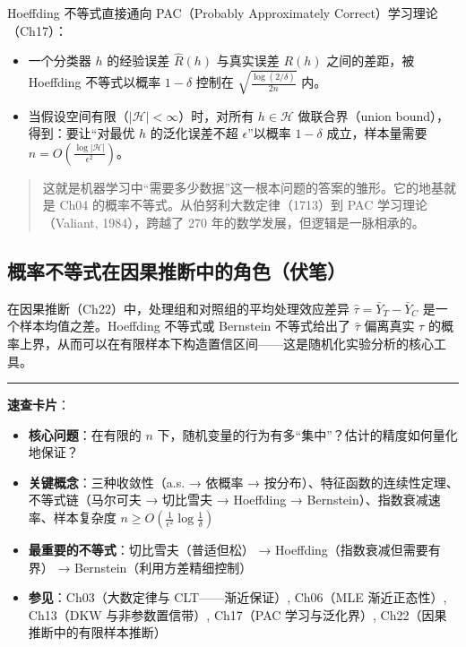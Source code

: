 \documentclass[
]{book}
\providecommand{\tightlist}{%
  \setlength{\itemsep}{0pt}\setlength{\parskip}{0pt}}
\begin{document}
Hoeffding 不等式直接通向 PAC（Probably Approximately Correct）学习理论（Ch17）：

\begin{itemize}
\tightlist
\item
  一个分类器 \(h\) 的经验误差 \(\hat{R}(h)\) 与真实误差 \(R(h)\) 之间的差距，被 Hoeffding 不等式以概率 \(1-\delta\) 控制在 \(\sqrt{\frac{\log(2/\delta)}{2n}}\) 内。
\item
  当假设空间有限（\(|\mathcal{H}| < \infty\)）时，对所有 \(h \in \mathcal{H}\) 做联合界（union bound），得到：要让``对最优 \(h\) 的泛化误差不超 \(\epsilon\)''以概率 \(1-\delta\) 成立，样本量需要 \(n = O(\frac{\log |\mathcal{H}|}{\epsilon^2})\)。
\end{itemize}

\begin{quote}
这就是机器学习中``需要多少数据''这一根本问题的答案的雏形。它的地基就是 Ch04 的概率不等式。从伯努利大数定律（1713）到 PAC 学习理论（Valiant, 1984），跨越了 270 年的数学发展，但逻辑是一脉相承的。
\end{quote}

\subsection{概率不等式在因果推断中的角色（伏笔）}\label{ux6982ux7387ux4e0dux7b49ux5f0fux5728ux56e0ux679cux63a8ux65adux4e2dux7684ux89d2ux8272ux4f0fux7b14}

在因果推断（Ch22）中，处理组和对照组的平均处理效应差异 \(\hat{\tau} = \bar{Y}_T - \bar{Y}_C\) 是一个样本均值之差。Hoeffding 不等式或 Bernstein 不等式给出了 \(\hat{\tau}\) 偏离真实 \(\tau\) 的概率上界，从而可以在有限样本下构造置信区间------这是随机化实验分析的核心工具。

\begin{center}\rule{0.5\linewidth}{0.5pt}\end{center}

\textbf{速查卡片}：

\begin{itemize}
\tightlist
\item
  \textbf{核心问题}：在有限的 \(n\) 下，随机变量的行为有多``集中''？估计的精度如何量化地保证？
\item
  \textbf{关键概念}：三种收敛性（a.s. → 依概率 → 按分布）、特征函数的连续性定理、不等式链（马尔可夫 → 切比雪夫 → Hoeffding → Bernstein）、指数衰减速率、样本复杂度 \(n \geq O(\frac{1}{\epsilon^2} \log\frac{1}{\delta})\)
\item
  \textbf{最重要的不等式}：切比雪夫（普适但松） → Hoeffding（指数衰减但需要有界） → Bernstein（利用方差精细控制）
\item
  \textbf{参见}：Ch03（大数定律与 CLT------渐近保证）, Ch06（MLE 渐近正态性）, Ch13（DKW 与非参数置信带）, Ch17（PAC 学习与泛化界）, Ch22（因果推断中的有限样本推断）
\end{itemize}
\end{document}
